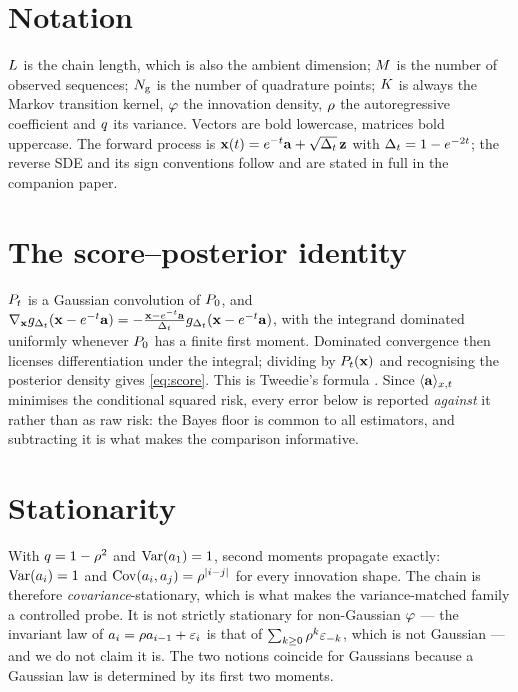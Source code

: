 
\section{Notation}
\label{app:notation}

$L$ is the chain length, which is also the ambient dimension; $M$ is the number of
observed sequences; $N_{\mathrm{g}}$ is the number of quadrature points; $K$ is always the Markov
transition kernel, $\varphi$ the innovation density, $\rho$ the autoregressive coefficient and
$q$ its variance. Vectors are bold lowercase, matrices bold uppercase. The forward process is
$\mathbf{x}(t)=e^{-t}\mathbf{a}+\sqrt{\Delta_t}\,\mathbf{z}$ with $\Delta_t=1-e^{-2t}$; the reverse SDE and its sign conventions
follow \citet{anderson1982,haussmann1986} and are stated in full in the companion paper.

\section{The score--posterior identity}
\label{app:identity}

$P_t$ is a Gaussian convolution of $P_0$, and
$\nabla_{\mathbf{x}} g_{\Delta_t}(\mathbf{x}-e^{-t}\mathbf{a})=-\tfrac{\mathbf{x}-e^{-t}\mathbf{a}}{\Delta_t}g_{\Delta_t}(\mathbf{x}-e^{-t}\mathbf{a})$, with the
integrand dominated uniformly whenever $P_0$ has a finite first moment. Dominated convergence then
licenses differentiation under the integral; dividing by $P_t(\mathbf{x})$ and recognising the posterior
density gives \eqref{eq:score}. This is Tweedie's formula
\citep{robbins1956,miyasawa1961,efron2011}. Since $\langle \mathbf{a} \rangle_{x,t}$ minimises the conditional squared
risk, every error below is reported \emph{against} it rather than as raw risk: the Bayes floor is
common to all estimators, and subtracting it is what makes the comparison informative.

\section{Stationarity}
\label{app:stationary}

With $q=1-\rho^2$ and $\operatorname{Var}(a_1)=1$, second moments propagate exactly: $\operatorname{Var}(a_i)=1$ and
$\operatorname{Cov}(a_i,a_j)=\rho^{|i-j|}$ for every innovation shape. The chain is therefore
\emph{covariance}-stationary, which is what makes the variance-matched family a controlled probe.
It is not strictly stationary for non-Gaussian $\varphi$ --- the invariant law of
$a_i=\rho a_{i-1}+\varepsilon_i$ is that of $\sum_{k\ge0}\rho^k\varepsilon_{-k}$, which is not
Gaussian --- and we do not claim it is. The two notions coincide for Gaussians because a Gaussian
law is determined by its first two moments.

